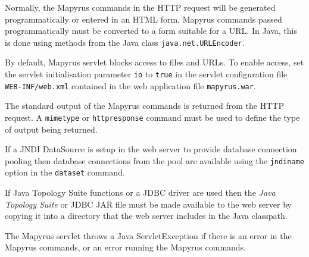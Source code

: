 Normally, the Mapyrus commands in the HTTP request will be generated
programmatically or entered in an HTML form.  Mapyrus commands
passed programmatically must be converted to a form suitable for
a URL.  In Java, this is done using methods from
the Java class \texttt{java.net.URLEncoder}.

By default, Mapyrus servlet blocks access to files and URLs.
To enable access, set the servlet initialisation
parameter \texttt{io} to \texttt{true} in
the servlet configuration file \texttt{WEB-INF/web.xml}
contained in the web application file \texttt{mapyrus.war}.

The standard output of the Mapyrus commands is returned from
the HTTP request.  A
\texttt{mimetype}
or
\texttt{httpresponse}
command must be used to define the type of output being returned.

If a JNDI DataSource is setup in the web server to provide 
database connection pooling then database connections from the
pool are available using the \texttt{jndiname} option in
the \texttt{dataset} command.

If Java Topology Suite functions or a JDBC driver are used then the
\textit{Java Topology Suite} or JDBC JAR file must be made available
to the web server by copying it into a directory that the web server
includes in the Java classpath.

The Mapyrus servlet throws a Java ServletException if there is an error
in the Mapyrus commands, or an error running the Mapyrus commands.
